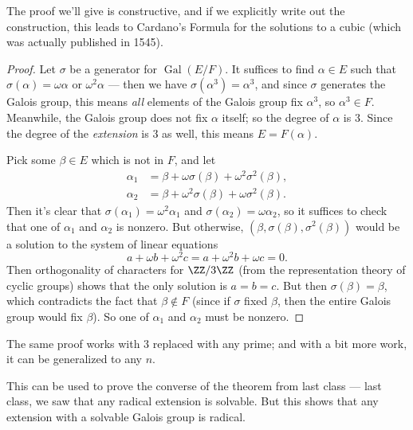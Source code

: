 The proof we'll give is constructive, and if we explicitly write out the construction, this leads to Cardano's Formula for the solutions to a cubic (which was actually published in 1545). 

\begin{proof}
    Let $\sigma$ be a generator for $\operatorname{Gal}(E/F)$. It suffices to find $\alpha \in E$ such that $\sigma(\alpha) = \omega\alpha$ or $\omega^2\alpha$ --- then we have $\sigma(\alpha^3) = \alpha^3$, and since $\sigma$ generates the Galois group, this means \emph{all} elements of the Galois group fix $\alpha^3$, so $\alpha^3 \in F$. Meanwhile, the Galois group does not fix $\alpha$ itself; so the degree of $\alpha$ is $3$. Since the degree of the \emph{extension} is $3$ as well, this means $E = F(\alpha)$. 
    
    Pick some $\beta \in E$ which is not in $F$, and let 
    \begin{align*}
        \alpha_1 &= \beta + \omega\sigma(\beta) + \omega^2\sigma^2(\beta), \\
        \alpha_2 &= \beta + \omega^2\sigma(\beta) + \omega\sigma^2(\beta).
    \end{align*}
    Then it's clear that $\sigma(\alpha_1) = \omega^2\alpha_1$ and $\sigma(\alpha_2) = \omega\alpha_2$, so it suffices to check that one of $\alpha_1$ and $\alpha_2$ is nonzero. But otherwise, $(\beta, \sigma(\beta), \sigma^2(\beta))$ would be a solution to the system of linear equations \[a + \omega b + \omega^2 c = a + \omega^2 b + \omega c = 0.\] Then orthogonality of characters for $\ZZ/3\ZZ$ (from the representation theory of cyclic groups) shows that the only solution is $a = b = c$. But then $\sigma(\beta) = \beta$, which contradicts the fact that $\beta \not\in F$ (since if $\sigma$ fixed $\beta$, then the entire Galois group would fix $\beta$). So one of $\alpha_1$ and $\alpha_2$ must be nonzero.
\end{proof}

\begin{note}
    The same proof works with $3$ replaced with any prime; and with a bit more work, it can be generalized to any $n$. 
    
    This can be used to prove the converse of the theorem from last class --- last class, we saw that any radical extension is solvable. But this shows that any extension with a solvable Galois group is radical. 
\end{note}


